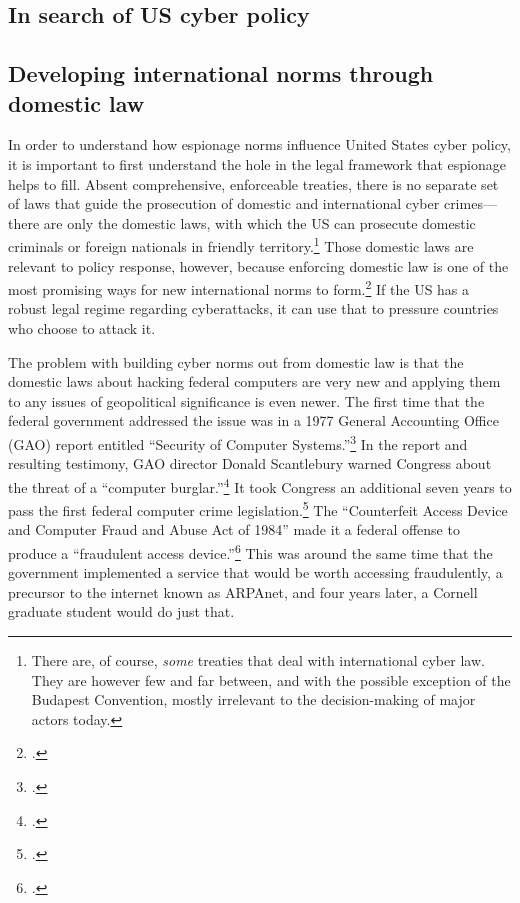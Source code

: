 \documentclass{memoir}
\begin{document}
\begin{refsegment}

\section{In search of US cyber policy}
\subsection{Developing international norms through domestic law}
In order to understand how espionage norms influence United States cyber policy, it is important to first understand the hole in the legal framework that espionage helps to fill. Absent comprehensive, enforceable treaties, there is no separate set of laws that guide the prosecution of domestic and international cyber crimes---there are only the domestic laws, with which the US can prosecute domestic criminals or foreign nationals in friendly territory.\footnote{There are, of course, \emph{some} treaties that deal with international cyber law. They are however few and far between, and with the possible exception of the Budapest Convention, mostly irrelevant to the decision-making of major actors today.} Those domestic laws are relevant to policy response, however, because enforcing domestic law is one of the most promising ways for new international norms to form.\footcite[p.~295]{deeks_international_2015} If the US has a robust legal regime regarding cyberattacks, it can use that to pressure countries who choose to attack it.

The problem with building cyber norms out from domestic law is that the domestic laws about hacking federal computers are very new and applying them to any issues of geopolitical significance is even newer. The first time that the federal government addressed the issue was in a 1977 General Accounting Office (GAO) report entitled ``Security of Computer Systems.''\footcite{washington_post_staff_timeline_2003} In the report and resulting testimony, GAO director Donald Scantlebury warned Congress about the threat of a ``computer burglar.''\footcite{u.s._government_accounting_office_security_1977} It took Congress an additional seven years to pass the first federal computer crime legislation.\footcite[The later bill cited here, the Computer Security Act of 1987, describes the 1984 bill as being the first federal legislation in this area.]{glickman_computer_1988} The ``Counterfeit Access Device and Computer Fraud and Abuse Act of 1984'' made it a federal offense to produce a ``fraudulent access device.''\footcite{hughes_access_1984} This was around the same time that the government implemented a service that would be worth accessing fraudulently, a precursor to the internet known as ARPAnet, and four years later, a Cornell graduate student would do just that.


\end{refsegment}
\end{document}
